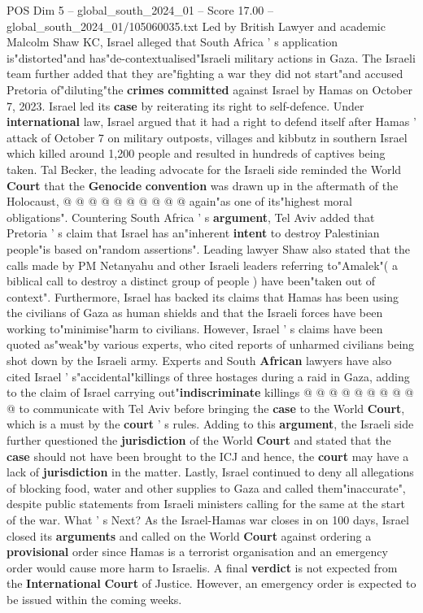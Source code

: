\begin{textsample}{POS Dim 5 – global\_south\_2024\_01 – Score 17.00 – global\_south\_2024\_01/105060035.txt}
Led by British Lawyer and academic Malcolm Shaw KC, Israel alleged that South Africa ' s application is"distorted"and has"de-contextualised"Israeli military actions in Gaza.
The Israeli team further added that they are"fighting a war they did not start"and accused Pretoria of"diluting"the \textbf{crimes} \textbf{committed} against Israel by Hamas on October 7, 2023.
Israel led its \textbf{case} by reiterating its right to self-defence.
Under \textbf{international} law, Israel argued that it had a right to defend itself after Hamas ' attack of October 7 on military outposts, villages and kibbutz in southern Israel which killed around 1,200 people and resulted in hundreds of captives being taken.
Tal Becker, the leading advocate for the Israeli side reminded the World \textbf{Court} that the \textbf{Genocide} \textbf{convention} was drawn up in the aftermath of the Holocaust, @ @ @ @ @ @ @ @ @ @ again"as one of its"highest moral obligations".
Countering South Africa ' s \textbf{argument}, Tel Aviv added that Pretoria ' s claim that Israel has an"inherent \textbf{intent} to destroy Palestinian people"is based on"random assertions".
Leading lawyer Shaw also stated that the calls made by PM Netanyahu and other Israeli leaders referring to"Amalek"( a biblical call to destroy a distinct group of people ) have been"taken out of context".
Furthermore, Israel has backed its claims that Hamas has been using the civilians of Gaza as human shields and that the Israeli forces have been working to"minimise"harm to civilians.
However, Israel ' s claims have been quoted as"weak"by various experts, who cited reports of unharmed civilians being shot down by the Israeli army.
Experts and South \textbf{African} lawyers have also cited Israel ' s"accidental"killings of three hostages during a raid in Gaza, adding to the claim of Israel carrying out"\textbf{indiscriminate} killings @ @ @ @ @ @ @ @ @ @ to communicate with Tel Aviv before bringing the \textbf{case} to the World \textbf{Court}, which is a must by the \textbf{court} ' s rules.
Adding to this \textbf{argument}, the Israeli side further questioned the \textbf{jurisdiction} of the World \textbf{Court} and stated that the \textbf{case} should not have been brought to the ICJ and hence, the \textbf{court} may have a lack of \textbf{jurisdiction} in the matter.
Lastly, Israel continued to deny all allegations of blocking food, water and other supplies to Gaza and called them"inaccurate", despite public statements from Israeli ministers calling for the same at the start of the war.
What ' s Next?
As the Israel-Hamas war closes in on 100 days, Israel closed its \textbf{arguments} and called on the World \textbf{Court} against ordering a \textbf{provisional} order since Hamas is a terrorist organisation and an emergency order would cause more harm to Israelis.
A final \textbf{verdict} is not expected from the \textbf{International} \textbf{Court} of Justice.
However, an emergency order is expected to be issued within the coming weeks.

\end{textsample}

